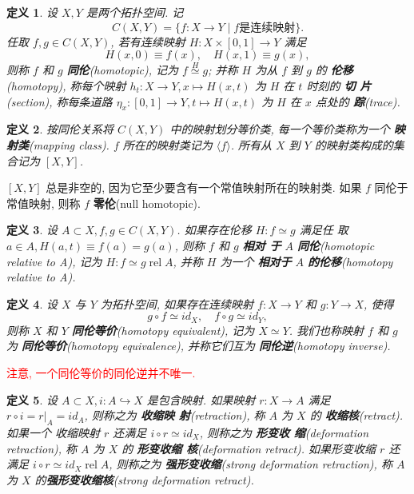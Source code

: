 \documentclass[UTF8]{ctexart}
\newtheorem*{defn}{定义}
\DeclareMathOperator{\rel}{rel}
\begin{document}
\begin{defn}
设 $X,Y$ 是两个拓扑空间. 记
\[
C(X,Y) = \{f : X \to Y \mid f \text{是连续映射}\}.
\]
任取 $f,g \in C(X,Y)$, 若有连续映射 $H : X \times [0,1] \to Y$ 满足
\[
H(x,0) \equiv f(x),\hspace{1em} H(x,1) \equiv g(x),
\]
则称 $f$ 和 $g$ \textbf{同伦}(homotopic), 记为 $f \overset{H}{\simeq}
g$; 并称 $H$ 为从 $f$ 到 $g$ 的 \textbf{伦移}(homotopy), 称每个映射
$h_t : X \to Y, x \mapsto H(x,t)$ 为 $H$ 在 $t$ 时刻的 \textbf{切
  片}(section), 称每条道路 $\eta_x : [0,1] \to Y, t \mapsto H(x,t)$ 为
$H$ 在 $x$ 点处的 \textbf{踪}(trace).
\end{defn}
\begin{defn}
按同伦关系将 $C(X,Y)$ 中的映射划分等价类, 每一个等价类称为一个
\textbf{映射类}(mapping class). $f$ 所在的映射类记为 $\langle f
\rangle$. 所有从 $X$ 到 $Y$ 的映射类构成的集合记为 $[X,Y]$.
\end{defn}

$[X,Y]$ 总是非空的, 因为它至少要含有一个常值映射所在的映射类. 如果 $f$
同伦于常值映射, 则称 $f$ \textbf{零伦}(null homotopic).

\begin{defn}
设 $A \subset X, f,g \in C(X,Y)$. 如果存在伦移 $H : f \simeq g$ 满足任
取 $a \in A, H(a,t) \equiv f(a) = g(a)$, 则称 $f$ 和 $g$ \textbf{相对
  于} $A$ \textbf{同伦}(homotopic relative to A), 记为 $H : f \simeq g
\rel A$, 并称 $H$ 为一个 \textbf{相对于} $A$ \textbf{的伦移}(homotopy
relative to A).
\end{defn}

\begin{defn}
设 $X$ 与 $Y$ 为拓扑空间, 如果存在连续映射 $f : X \to Y$ 和 $g : Y \to
X$, 使得
\[
g \circ f \simeq id_X, \hspace{1em} f \circ g \simeq id_Y,
\]
则称 $X$ 和 $Y$ \textbf{同伦等价}(homotopy equivalent), 记为 $X \simeq
Y$. 我们也称映射 $f$ 和 $g$ 为 \textbf{同伦等价}(homotopy
equivalence), 并称它们互为 \textbf{同伦逆}(homotopy inverse).
\end{defn}
\textcolor{red}{注意, 一个同伦等价的同伦逆并不唯一.}

\begin{defn}
设 $A \subset X, i : A \hookrightarrow X$ 是包含映射. 如果映射 $r : X
\to A$ 满足 $r \circ i = r|_A = id_A$, 则称之为 \textbf{收缩映
  射}(retraction), 称 $A$ 为 $X$ 的 \textbf{收缩核}(retract). 如果一个
收缩映射 $r$ 还满足 $i \circ r \simeq id_X$, 则称之为 \textbf{形变收
  缩}(deformation retraction), 称 $A$ 为 $X$ 的 \textbf{形变收缩
  核}(deformation retract). 如果形变收缩 $r$ 还满足 $i \circ r \simeq
id_X \rel A$, 则称之为 \textbf{强形变收缩}(strong deformation
retraction), 称 $A$ 为 $X$ 的\textbf{强形变收缩核}(strong deformation retract).
\end{defn}
\end{document}
